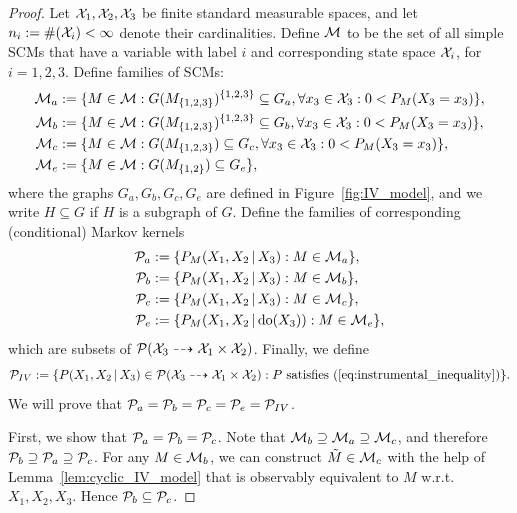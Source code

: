 \begin{proof}
  Let $\mathcal{X}_1, \mathcal{X}_2, \mathcal{X}_3$ be finite standard measurable spaces, and let $n_i := \#(\mathcal{X}_i) < \infty$ denote their cardinalities.
  Define $\mathcal{M}$ to be the set of all simple SCMs that have a variable with label $i$ and corresponding state space $\mathcal{X}_i$, for $i=1,2,3$.
  Define families of SCMs:
  \begin{align*}
    \mathcal{M}_a &:= \{ M \in \mathcal{M} : G(M_{\{1,2,3\}})^{\{1,2,3\}} \subseteq G_a, \forall x_3 \in \mathcal{X}_3: 0 < P_M(X_3=x_3) \}, \\
    \mathcal{M}_b &:= \{ M \in \mathcal{M} : G(M_{\{1,2,3\}})^{\{1,2,3\}} \subseteq G_b, \forall x_3 \in \mathcal{X}_3: 0 < P_M(X_3=x_3) \}, \\
    \mathcal{M}_c &:= \{ M \in \mathcal{M} : G(M_{\{1,2,3\}}) \subseteq G_c, \forall x_3 \in \mathcal{X}_3: 0 < P_M(X_3=x_3) \}, \\
    \mathcal{M}_e &:= \{ M \in \mathcal{M} : G(M_{\{1,2\}}) \subseteq G_e \},
  \end{align*}
  where the graphs $G_a,G_b,G_c,G_e$ are defined in Figure~\ref{fig:IV_model}, and we write $H \subseteq G$ if $H$ is a subgraph of $G$.
  Define the families of corresponding (conditional) Markov kernels 
  \begin{align*}
    \mathcal{P}_a &:= \{ P_M(X_1, X_2 \operatorname*{|} X_3) : M \in \mathcal{M}_a \}, \\
    \mathcal{P}_b &:= \{ P_M(X_1, X_2 \operatorname*{|} X_3) : M \in \mathcal{M}_b \}, \\
    \mathcal{P}_c &:= \{ P_M(X_1, X_2 \operatorname*{|} X_3) : M \in \mathcal{M}_c \}, \\
    \mathcal{P}_e &:= \{ P_M(X_1, X_2 \operatorname*{|} \operatorname{do}(X_3)) : M \in \mathcal{M}_e \},
  \end{align*}
  which are subsets of $\mathcal{P}(\mathcal{X}_3 \dashrightarrow \mathcal{X}_1 \times \mathcal{X}_2)$.
  Finally, we define
  \begin{equation}\label{eq:kernels_satisfying_IV}
    \C{P}_{IV} := \{ P(X_1,X_2 \given X_3) \in \Pcal(\CX_3 \dshto \CX_1 \times \CX_2): \text{$P$ satisfies \eref{eq:instrumental_inequality}} \}.
  \end{equation}
  We will prove that $\mathcal{P}_a = \mathcal{P}_b = \mathcal{P}_c = \mathcal{P}_e = \mathcal{P}_{IV}$.

  First, we show that $\mathcal{P}_a = \mathcal{P}_b = \mathcal{P}_c$.
  Note that $\mathcal{M}_b \supseteq \mathcal{M}_a \supseteq \mathcal{M}_c$, and therefore $\mathcal{P}_b \supseteq \mathcal{P}_a \supseteq \mathcal{P}_c$.
  For any $M \in \mathcal{M}_b$, we can construct $\tilde{M} \in \mathcal{M}_c$ with the help of Lemma~\ref{lem:cyclic_IV_model} that is observably equivalent to $M$ w.r.t.\ $X_1,X_2,X_3$.
  Hence $\mathcal{P}_b \subseteq \mathcal{P}_c$.


\end{proof}
